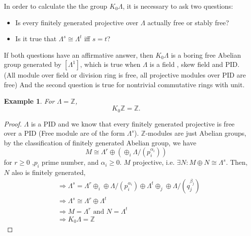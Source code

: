 \documentclass[11pt]{article}
\newtheorem{ex}[thm]{Example}
\newcommand{\intg}{\mathbb Z}
\newcommand{\Lrta}{\Longrightarrow}
\begin{document}
In order to calculate the the group $K_0\Lambda$, it is necessary to ask two questions:
\begin{itemize}
\item Is every finitely generated projective over $\Lambda$ actually free or stably free?
\item Is it true that $\Lambda^s\cong \Lambda^t$ iff $s=t$?
\end{itemize}
If both questions have an affirmative answer, then $K_0\Lambda$ is a boring free Abelian group generated by $[\Lambda^1]$, which is true when $\Lambda$ is a field , skew field and PID. (All module over field or division ring is free, all projective modules over PID are free) And the second question is true for nontrivial commutative rings with unit.
\begin{ex} For 
$\Lambda=\intg$,
$$
K_0\intg =\intg.
$$
\end{ex}
\begin{proof}
$\Lambda $ is a PID and we know that every finitely generated projective is free over a PID (Free module are of the form $\Lambda^s$). $\intg$-modules are just Abelian groups, by the classification of finitely generated Abelian group, we have 
$$
M\cong \Lambda ^r\oplus (\oplus_i  \Lambda/(p_i^{\alpha_i}))
$$
for $r\geq 0$ ,$p_i$ prime number, and $\alpha_i\geq0$.
$M$ projective, i.e.  $\exists N: M\oplus N\cong \Lambda^s$. Then, $N$ also is finitely generated,
$$
\begin{aligned}
&\Lrta \Lambda^s  =\Lambda^r\oplus_i \oplus \Lambda/(p_i^{\alpha_i})\oplus \Lambda^t\oplus_j \oplus \Lambda/(q_j^{\beta_j})\\
& \Lrta \Lambda^s\cong \Lambda^r\oplus \Lambda^t\\
& \Lrta M=\Lambda^r \text{ and } N=\Lambda^t\\ 
&\Lrta K_0\Lambda=\intg
\end{aligned}
$$
\end{proof}
\end{document}

